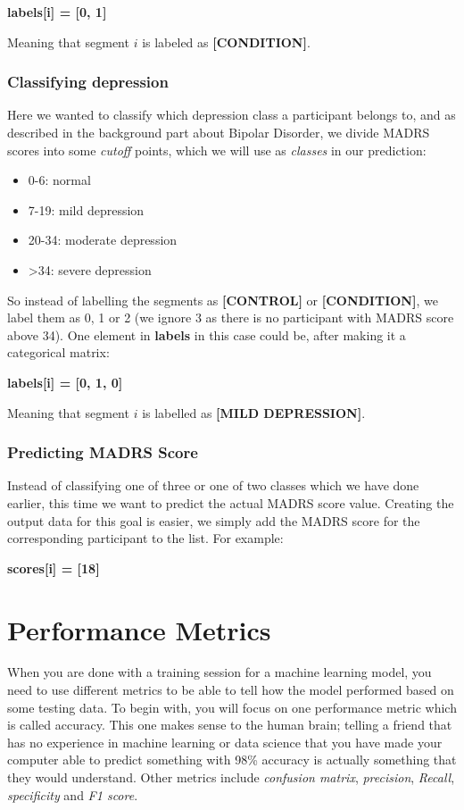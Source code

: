 \textbf{labels[i] = [0, 1]}

\noindent Meaning that segment $i$ is labeled as \textbf{[CONDITION]}.

\subsubsection{Classifying depression}
Here we wanted to classify which depression class a participant belongs to, and as described in the background part about Bipolar Disorder, 
we divide MADRS scores into some \textit{cutoff} points, which we will use as \textit{classes} in our prediction:

\begin{itemize}
  \item 0-6: normal
  \item 7-19: mild depression
  \item 20-34: moderate depression
  \item >34: severe depression
\end{itemize}

So instead of labelling the segments as \textbf{[CONTROL]} or \textbf{[CONDITION]}, we label them as 0, 1 or 2 (we ignore 3 as there is no participant with 
MADRS score above 34). One element in \textbf{labels} in this case could be, after making it a categorical matrix:

\textbf{labels[i] = [0, 1, 0]}

\noindent Meaning that segment $i$ is labelled as \textbf{[MILD DEPRESSION]}.

\subsubsection{Predicting MADRS Score}

Instead of classifying one of three or one of two classes which we have done earlier, this time we want to predict the actual MADRS score value. 
Creating the output data for this goal is easier, we simply add the MADRS score for the corresponding participant to the list. For example:

\textbf{scores[i] = [18]}

\section{Performance Metrics}

When you are done with a training session for a machine learning model, you need to use different metrics to be able to tell how the model performed based on some testing data. 
To begin with, you will focus on one performance metric which is called accuracy. This one makes sense to the human brain; 
telling a friend that has no experience in machine learning or data science that you have made your computer able to predict 
something with 98\% accuracy is actually something that they would understand. Other metrics include \textit{confusion matrix}, \textit{precision}, \textit{Recall}, 
\textit{specificity} and \textit{F1 score}.

